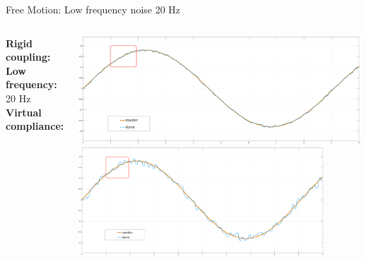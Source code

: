 \documentclass[10pt]{beamer}
\begin{document}
\begin{frame}{Free Motion: Low frequency noise 20 Hz}
\smallskip
\begin{columns}
	\color{Orange}\textbf{Rigid coupling:}\\
	\bigskip
	\bigskip
	\bigskip
	\color{black}\textbf{Low frequency:} 20 Hz\\
	\bigskip
	\bigskip
	\bigskip
	\color{LightBlue}\textbf{Virtual compliance:}\\
	
	
	\includegraphics[width=\textwidth,
	height=0.45\textwidth]{../reportTeleop/Images/freerigidTot20HtznoiseRect}\\
	\smallskip
	\includegraphics[width=\textwidth,
	height=0.45\textwidth]{../reportTeleop/Images/freeSet20Tot20HtznoiseRect}
\end{columns}

\end{frame}
\end{document}
